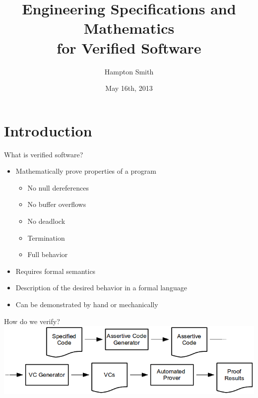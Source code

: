 \documentclass{beamer}
\title[Engineering Specifications and Mathematics]{Engineering Specifications and Mathematics\\for Verified Software}
\author{Hampton Smith}
\institute{Clemson University}
\date{May 16th, 2013}
\begin{document}


\begin{frame}
\titlepage
\end{frame}

\section{Introduction}
\begin{frame}{What is verified software?}
	\begin{itemize}
		\item Mathematically prove properties of a program
		\begin{itemize}
			\item No null dereferences
			\item No buffer overflows
			\item No deadlock
			\item Termination
			\item Full behavior
		\end{itemize}
		\item Requires formal semantics
		\item Description of the desired behavior in a formal language
		\item Can be demonstrated by hand or mechanically
	\end{itemize}
\end{frame}


\begin{frame}{How do we verify?}
	\includegraphics[width=\textwidth]{verificationProcess}
\end{frame}
\end{document}
